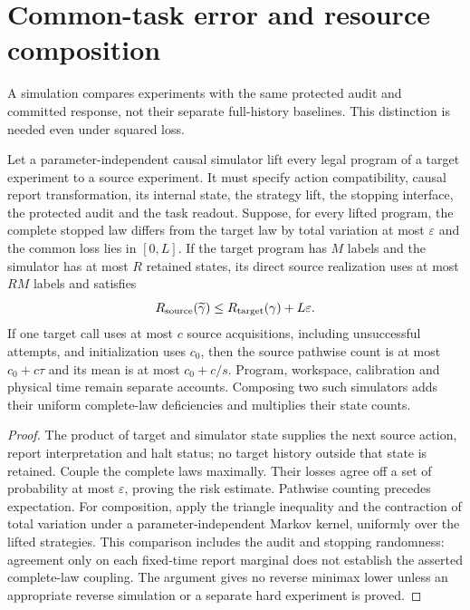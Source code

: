 \section{Common-task error and resource composition}\label{sec:composition}
A simulation compares experiments with the same protected audit and committed response, not their separate full-history baselines. This distinction is needed even under squared loss.

\begin{proposition}\label{prop:simulation}
Let a parameter-independent causal simulator lift every legal program of a target experiment to a source experiment. It must specify action compatibility, causal report transformation, its internal state, the strategy lift, the stopping interface, the protected audit and the task readout. Suppose, for every lifted program, the complete stopped law differs from the target law by total variation at most $\varepsilon$ and the common loss lies in $[0,L]$. If the target program has $M$ labels and the simulator has at most $R$ retained states, its direct source realization uses at most $RM$ labels and satisfies
\[
 R_{\rm source}(\widetilde\gamma)\le R_{\rm target}(\gamma)+L\varepsilon.
\]
If one target call uses at most $c$ source acquisitions, including unsuccessful attempts, and initialization uses $c_0$, then the source pathwise count is at most $c_0+c\tau$ and its mean is at most $c_0+c/s$. Program, workspace, calibration and physical time remain separate accounts. Composing two such simulators adds their uniform complete-law deficiencies and multiplies their state counts.
\end{proposition}
\begin{proof}
The product of target and simulator state supplies the next source action, report interpretation and halt status; no target history outside that state is retained. Couple the complete laws maximally. Their losses agree off a set of probability at most $\varepsilon$, proving the risk estimate. Pathwise counting precedes expectation. For composition, apply the triangle inequality and the contraction of total variation under a parameter-independent Markov kernel, uniformly over the lifted strategies. This comparison includes the audit and stopping randomness: agreement only on each fixed-time report marginal does not establish the asserted complete-law coupling. The argument gives no reverse minimax lower unless an appropriate reverse simulation or a separate hard experiment is proved.
\end{proof}

